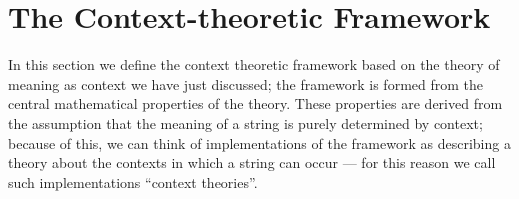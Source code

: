 \section{The Context-theoretic Framework}
\label{context-theoretic-framework}


In this section we define the context theoretic framework based on the theory of meaning as context we have just discussed; the framework is formed from the central mathematical properties of the theory. These properties are derived from the assumption that the meaning of a string is purely determined by context; because of this, we can think of implementations of the framework as describing a theory about the contexts in which a string can occur --- for this reason we call such implementations ``context theories''.


